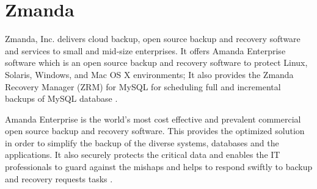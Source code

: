 \section{Zmanda}
Zmanda, Inc. delivers cloud backup, open source backup and recovery software 
and services to small and mid-size enterprises. It offers Amanda Enterprise 
software which is an open source backup and recovery software to protect 
Linux, Solaris, Windows, and Mac OS X environments; It also provides the 
Zmanda Recovery Manager (ZRM) for MySQL for scheduling full and 
incremental backups of MySQL database  \cite{hid-sp18-412-zmanda_crunchbase}. 

Amanda Enterprise is the world's most cost effective and prevalent commercial 
open source backup and recovery software.  This provides the optimized 
solution in order to simplify the backup of the diverse systems, 
databases and the applications. It also securely protects the 
critical data and enables the IT professionals to guard against the 
mishaps and helps to respond swiftly to backup and recovery requests 
tasks \cite{hid-sp18-412-zmanda_webinar}.
